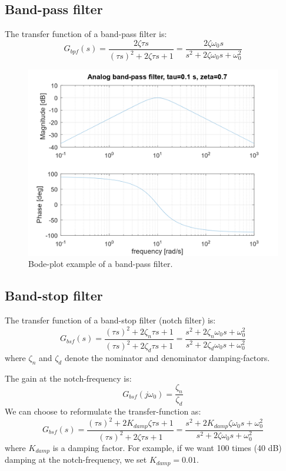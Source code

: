 \documentclass[]{book}
\begin{document}
\hypertarget{band-pass-filter}{%
\subsection{Band-pass filter}\label{band-pass-filter}}

The transfer function of a band-pass filter is:
\[
G_{bpf}(s) =  \frac{2\zeta \tau s}{(\tau s)^2 + 2\zeta \tau s + 1} = \frac{2\zeta \omega_0 s}{s^2 + 2\zeta \omega_0 s + \omega_0^2}
\label{eq:bpf}
\]

\begin{figure}
\includegraphics[width=1\linewidth]{images/filters/bpf} \caption{Bode-plot example of a band-pass filter.}\label{fig:unnamed-chunk-5}
\end{figure}

\hypertarget{band-stop-filter}{%
\subsection{Band-stop filter}\label{band-stop-filter}}

The transfer function of a band-stop filter (notch filter) is:
\[
G_{bsf}(s) = \frac{(\tau s)^2 + 2\zeta_n \tau s + 1}{(\tau s)^2 + 2\zeta_d \tau s + 1} 
=\frac{s^2 + 2\zeta_n \omega_0 s + \omega_0^2}{s^2 + 2\zeta_d \omega_0 s + \omega_0^2}
\label{eq:bsf1}
\]
where \(\zeta_n\) and \(\zeta_d\) denote the nominator and denominator damping-factors.

The gain at the notch-frequency is:
\[
G_{bsf}(j\omega_0) = \frac{\zeta_n }{\zeta_d }
\label{eq:bsf2}
\]
We can choose to reformulate the transfer-function as:
\[
G_{bsf}(s) = \frac{(\tau s)^2 + 2K_{damp}\zeta \tau s + 1}{(\tau s)^2 + 2\zeta \tau s + 1} 
=\frac{s^2 + 2K_{damp}\zeta \omega_0 s + \omega_0^2}{s^2 + 2\zeta \omega_0 s + \omega_0^2}
\label{eq:bsf1}
\]
where \(K_{damp}\) is a damping factor. For example, if we want 100 times (40 dB) damping at the notch-frequency, we set \(K_{damp} = 0.01\).
\end{document}
